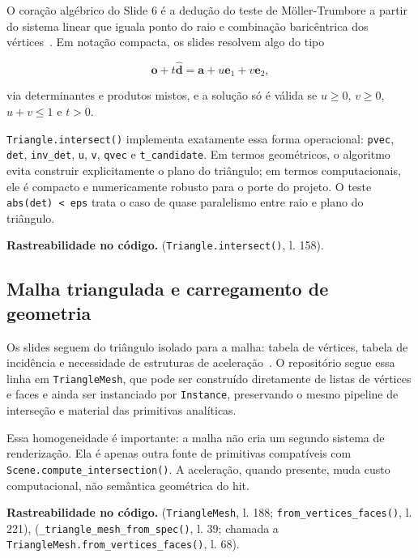 \documentclass[portuguese]{sbcreviews-2025}%
\newcommand{\slidescite}[2]{\citep[pp.~#2]{#1}}
\begin{document}
O coração algébrico do Slide 6 é a dedução do teste de Möller-Trumbore a partir do sistema linear que iguala ponto do raio e combinação baricêntrica dos vértices~\slidescite{inf2608slides06}{5--12}. Em notação compacta, os slides resolvem algo do tipo

\[
\mathbf{o}+t\hat{\mathbf{d}} = \mathbf{a}+u\mathbf{e}_1+v\mathbf{e}_2,
\]

via determinantes e produtos mistos, e a solução só é válida se $u\ge 0$, $v\ge 0$, $u+v\le 1$ e $t>0$.

\texttt{Triangle.intersect()} implementa exatamente essa forma operacional: \texttt{pvec}, \texttt{det}, \texttt{inv\_det}, \texttt{u}, \texttt{v}, \texttt{qvec} e \texttt{t\_candidate}. Em termos geométricos, o algoritmo evita construir explicitamente o plano do triângulo; em termos computacionais, ele é compacto e numericamente robusto para o porte do projeto. O teste \texttt{abs(det) < eps} trata o caso de quase paralelismo entre raio e plano do triângulo.

\noindent\textbf{Rastreabilidade no código.}  (\texttt{Triangle.intersect()}, l. 158).

\subsection{Malha triangulada e carregamento de geometria}
\label{sec:slide6-malha}

Os slides seguem do triângulo isolado para a malha: tabela de vértices, tabela de incidência e necessidade de estruturas de aceleração~\slidescite{inf2608slides06}{13--14}. O repositório segue essa linha em \texttt{TriangleMesh}, que pode ser construído diretamente de listas de vértices e faces e ainda ser instanciado por \texttt{Instance}, preservando o mesmo pipeline de interseção e material das primitivas analíticas.

Essa homogeneidade é importante: a malha não cria um segundo sistema de renderização. Ela é apenas outra fonte de primitivas compatíveis com \texttt{Scene.compute\_intersection()}. A aceleração, quando presente, muda custo computacional, não semântica geométrica do hit.

\noindent\textbf{Rastreabilidade no código.}  (\texttt{TriangleMesh}, l. 188; \texttt{from\_vertices\_faces()}, l. 221),  (\texttt{\_triangle\_mesh\_from\_spec()}, l. 39; chamada a \texttt{TriangleMesh.from\_vertices\_faces()}, l. 68).
\end{document}
